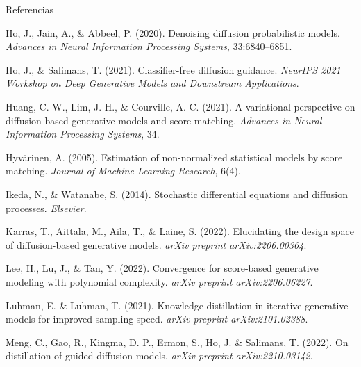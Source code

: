 \documentclass[aspectratio=169,xcolor=dvipsnames, t, spanish]{beamer}
\begin{document}
\begin{frame}{Referencias}
{\begin{thebibliography}{99}
                 Ho, J., Jain, A., \& Abbeel, P. (2020).
                \newblock Denoising diffusion probabilistic models.
                \newblock \emph{Advances in Neural Information Processing Systems}, 33:6840–6851.
    
                 Ho, J., \& Salimans, T. (2021).
                \newblock Classifier-free diffusion guidance.
                \newblock \emph{NeurIPS 2021 Workshop on Deep Generative Models and Downstream Applications}.
    
                 Huang, C.-W., Lim, J. H., \& Courville, A. C. (2021).
                \newblock A variational perspective on diffusion-based generative models and score matching.
                \newblock \emph{Advances in Neural Information Processing Systems}, 34.
    
                 Hyvärinen, A. (2005).
                \newblock Estimation of non-normalized statistical models by score matching.
                \newblock \emph{Journal of Machine Learning Research}, 6(4).
    
                 Ikeda, N., \& Watanabe, S. (2014).
                \newblock Stochastic differential equations and diffusion processes.
                \newblock \emph{Elsevier}.
                
                 Karras, T., Aittala, M., Aila, T., \& Laine, S. (2022).
                \newblock Elucidating the design space of diffusion-based generative models.
                \newblock \emph{arXiv preprint arXiv:2206.00364}.
    
                 Lee, H., Lu, J., \& Tan, Y. (2022).
                \newblock Convergence for score-based generative modeling with polynomial complexity.
                \newblock \emph{arXiv preprint arXiv:2206.06227}.
    
                 Luhman, E. \& Luhman, T. (2021).
                \newblock Knowledge distillation in iterative generative models for improved sampling speed.
                \newblock \emph{arXiv preprint arXiv:2101.02388}.
                
                 Meng, C., Gao, R., Kingma, D. P., Ermon, S., Ho, J. \& Salimans, T. (2022).
                \newblock On distillation of guided diffusion models.
                \newblock \emph{arXiv preprint arXiv:2210.03142}.
                

\end{thebibliography}}
\end{frame}
\end{document}
